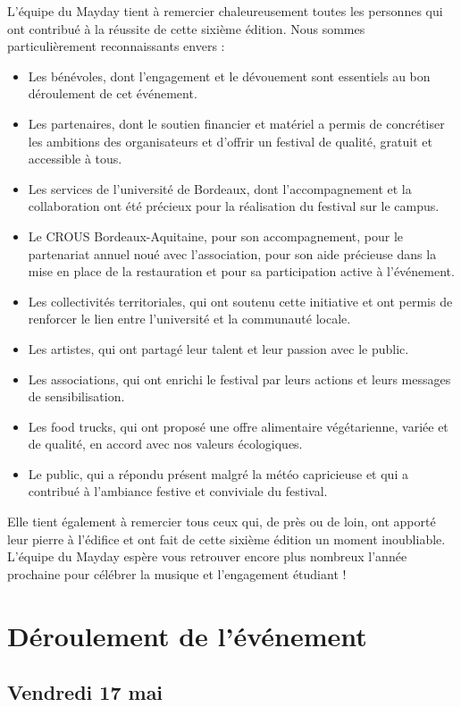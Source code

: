 \documentclass[12pt,a4paper]{report}
\begin{document}
L’équipe du Mayday tient à remercier chaleureusement toutes les personnes qui ont contribué à la réussite de cette sixième édition. Nous sommes particulièrement reconnaissants envers :
\begin{itemize}
\item Les bénévoles, dont l’engagement et le dévouement sont essentiels au bon déroulement de cet événement. 
\item Les partenaires, dont le soutien financier et matériel a permis de concrétiser les ambitions des organisateurs et d’offrir un festival de qualité, gratuit et accessible à tous.
\item Les services de l’université de Bordeaux, dont l’accompagnement et la collaboration ont été précieux pour la réalisation du festival sur le campus.
\item Le CROUS Bordeaux-Aquitaine, pour son accompagnement, pour le partenariat annuel noué avec l’association, pour son aide précieuse dans la mise en place de la restauration et pour sa participation active à l’événement.
\item Les collectivités territoriales, qui ont soutenu cette initiative et ont permis de renforcer le lien entre l’université et la communauté locale.
\item Les artistes, qui ont partagé leur talent et leur passion avec le public.
\item Les associations, qui ont enrichi le festival par leurs actions et leurs messages de sensibilisation.
\item Les food trucks, qui ont proposé une offre alimentaire végétarienne, variée et de qualité, en accord avec nos valeurs écologiques.
\item Le public, qui a répondu présent malgré la météo capricieuse et qui a contribué à l’ambiance festive et conviviale du festival.\\
\end{itemize}

Elle tient également à remercier tous ceux qui, de près ou de loin, ont apporté leur pierre à l’édifice et ont fait de cette sixième édition un moment inoubliable. L’équipe du Mayday espère vous retrouver encore plus nombreux l’année prochaine pour célébrer la musique et l’engagement étudiant !

\chapter{Déroulement de l'événement}
\section{Vendredi 17 mai}
\end{document}
